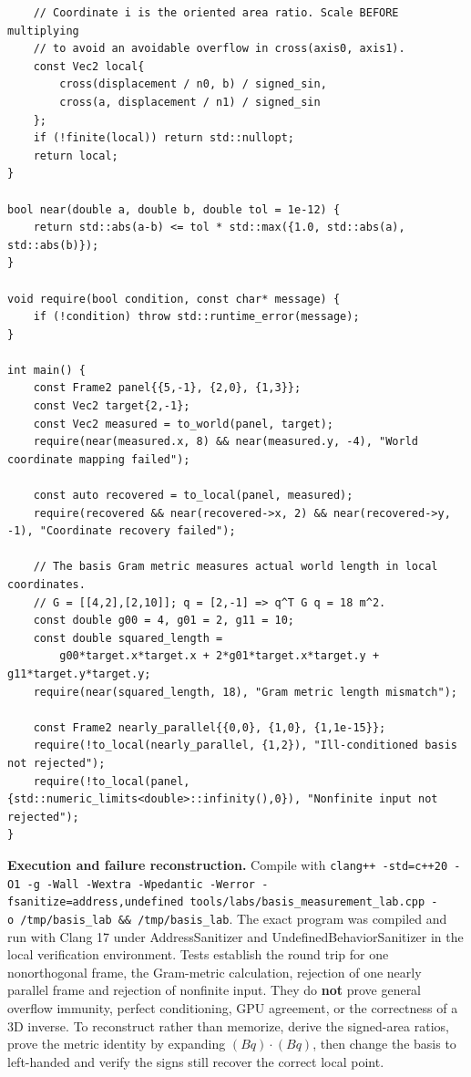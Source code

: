 \begin{verbatim}
    // Coordinate i is the oriented area ratio. Scale BEFORE multiplying
    // to avoid an avoidable overflow in cross(axis0, axis1).
    const Vec2 local{
        cross(displacement / n0, b) / signed_sin,
        cross(a, displacement / n1) / signed_sin
    };
    if (!finite(local)) return std::nullopt;
    return local;
}

bool near(double a, double b, double tol = 1e-12) {
    return std::abs(a-b) <= tol * std::max({1.0, std::abs(a), std::abs(b)});
}

void require(bool condition, const char* message) {
    if (!condition) throw std::runtime_error(message);
}

int main() {
    const Frame2 panel{{5,-1}, {2,0}, {1,3}};
    const Vec2 target{2,-1};
    const Vec2 measured = to_world(panel, target);
    require(near(measured.x, 8) && near(measured.y, -4), "World coordinate mapping failed");

    const auto recovered = to_local(panel, measured);
    require(recovered && near(recovered->x, 2) && near(recovered->y, -1), "Coordinate recovery failed");

    // The basis Gram metric measures actual world length in local coordinates.
    // G = [[4,2],[2,10]]; q = [2,-1] => q^T G q = 18 m^2.
    const double g00 = 4, g01 = 2, g11 = 10;
    const double squared_length =
        g00*target.x*target.x + 2*g01*target.x*target.y + g11*target.y*target.y;
    require(near(squared_length, 18), "Gram metric length mismatch");

    const Frame2 nearly_parallel{{0,0}, {1,0}, {1,1e-15}};
    require(!to_local(nearly_parallel, {1,2}), "Ill-conditioned basis not rejected");
    require(!to_local(panel, {std::numeric_limits<double>::infinity(),0}), "Nonfinite input not rejected");
}
\end{verbatim}

\textbf{Execution and failure reconstruction.} Compile with \texttt{clang++\ -std=c++20\ -O1\ -g\ -Wall\ -Wextra\ -Wpedantic\ -Werror\ -fsanitize=address,undefined\ tools/labs/basis\_measurement\_lab.cpp\ -o\ /tmp/basis\_lab\ \&\&\ /tmp/basis\_lab}. The exact program was compiled and run with Clang 17 under AddressSanitizer and UndefinedBehaviorSanitizer in the local verification environment. Tests establish the round trip for one nonorthogonal frame, the Gram-metric calculation, rejection of one nearly parallel frame and rejection of nonfinite input. They do \textbf{not} prove general overflow immunity, perfect conditioning, GPU agreement, or the correctness of a 3D inverse. To reconstruct rather than memorize, derive the signed-area ratios, prove the metric identity by expanding \((Bq)\cdot(Bq)\), then change the basis to left-handed and verify the signs still recover the correct local point.

